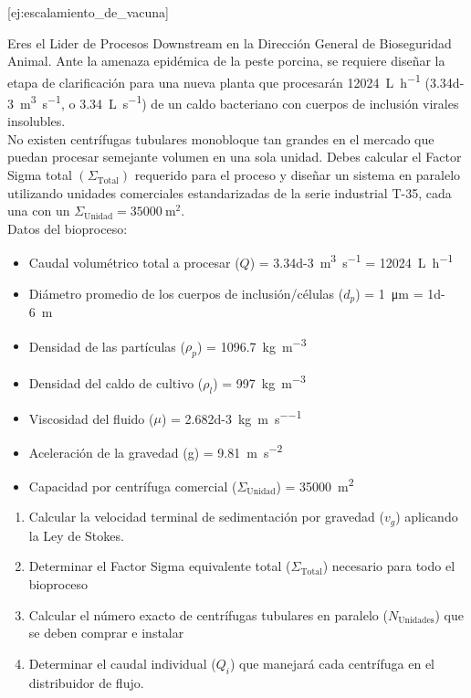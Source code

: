 \documentclass{AsignaturaResumen}
\begin{document}
[ej:escalamiento_de_vacuna]{
    Eres el Lider de Procesos Downstream en la Dirección General de Bioseguridad Animal. Ante la amenaza epidémica de la peste porcina, se requiere diseñar la etapa de clarificación para una nueva planta que procesarán \qty{12024}{\L\per\hour} (\qty{3.34d-3}{\m\cubed\per\s}, o \qty{3.34}{\L\per\s}) de un caldo bacteriano con cuerpos de inclusión virales insolubles. \\
    No existen centrífugas tubulares monobloque tan grandes en el mercado que puedan procesar semejante volumen en una sola unidad. Debes calcular el Factor Sigma total $(\Sigma_{\text{Total}})$ requerido para el proceso y diseñar un sistema en paralelo utilizando unidades comerciales estandarizadas de la serie industrial T-35, cada una con un $\Sigma_{\text{Unidad}} = \qty{35000}{\m\squared}$. \\
    Datos del bioproceso:
    \begin{itemize}
        \item Caudal volumétrico total a procesar ($Q$) = \qty{3.34d-3}{\m\cubed\per\s} = \qty{12024}{\L\per\hour}
        \item Diámetro promedio de los cuerpos de inclusión/células ($d_{p}$) = \qty{1}{\micro\m} = \qty{1d-6}{\m}
        \item Densidad de las partículas ($\rho_{p}$) = \qty{1096.7}{\kg\per\m\cubed}
        \item Densidad del caldo de cultivo ($\rho_{l}$) = \qty{997}{\kg\per\m\cubed}
        \item Viscosidad del fluido ($\mu$) = \qty{2.682d-3}{\kg\per\m\per\s}
        \item Aceleración de la gravedad (g) = \qty{9.81}{\m\per\s\squared}
        \item Capacidad por centrífuga comercial ($\Sigma_{\text{Unidad}}$) = \qty{35000}{\m\squared}
    \end{itemize}
    \begin{enumerate}
        \item Calcular la velocidad terminal de sedimentación por gravedad ($v_{g}$) aplicando la Ley de Stokes.
        \item Determinar el Factor Sigma equivalente total ($\Sigma_{\text{Total}}$) necesario para todo el bioproceso
        \item Calcular el número exacto de centrífugas tubulares en paralelo ($N_{\text{Unidades}}$) que se deben comprar e instalar
        \item Determinar el caudal individual ($Q_{i}$) que manejará cada centrífuga en el distribuidor de flujo.
    \end{enumerate}
} \clearpage
\end{document}
